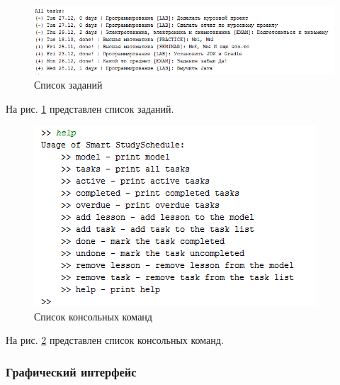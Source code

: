 \begin{figure}[H]
	\begin{center}
		\includegraphics[scale=0.8]{pics/2}
		\caption{Список заданий} 
		\label{pic:2} %
	\end{center}
\end{figure}
На рис. \ref{pic:2} представлен список заданий.

\begin{figure}[H]
	\begin{center}
		\includegraphics[scale=0.8]{pics/3}
		\caption{Список консольных команд} 
		\label{pic:3} %
	\end{center}
\end{figure}
На рис. \ref{pic:3} представлен список консольных команд.


\subsubsection{Графический интерфейс}

